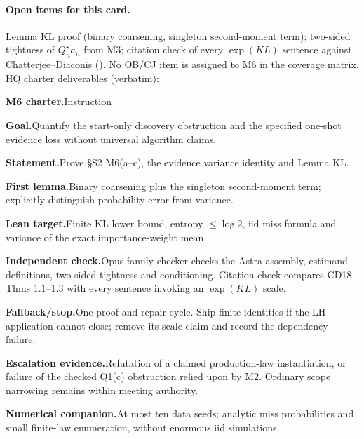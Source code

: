 \paragraph{Open items for this card.} Lemma KL proof (binary coarsening, singleton second-moment term); two-sided tightness of $Q^{\star}_n a_n$ from M3; citation check of every $\exp(KL)$ sentence against Chatterjee–Diaconis (). No OB/CJ item is assigned to M6 in the coverage matrix. HQ charter deliverables (verbatim):
\par\smallskip\noindent\textbf{M6 charter.}\enspace Instruction
\par\smallskip\noindent\textbf{Goal.}\enspace Quantify the start-only discovery obstruction and the specified one-shot evidence loss without universal algorithm claims.
\par\smallskip\noindent\textbf{Statement.}\enspace Prove §S2 M6(a–c), the evidence variance identity and Lemma KL.
\par\smallskip\noindent\textbf{First lemma.}\enspace Binary coarsening plus the singleton second-moment term; explicitly distinguish probability error from variance.
\par\smallskip\noindent\textbf{Lean target.}\enspace Finite KL lower bound, entropy \(\le\log2\), iid miss formula and variance of the exact importance-weight mean.
\par\smallskip\noindent\textbf{Independent check.}\enspace Opus-family checker checks the Astra assembly, estimand definitions, two-sided tightness and conditioning. Citation check compares CD18 Thms 1.1–1.3 with every sentence invoking an \(\exp(KL)\) scale.
\par\smallskip\noindent\textbf{Fallback/stop.}\enspace One proof-and-repair cycle. Ship finite identities if the LH application cannot close; remove its scale claim and record the dependency failure.
\par\smallskip\noindent\textbf{Escalation evidence.}\enspace Refutation of a claimed production-law instantiation, or failure of the checked Q1(c) obstruction relied upon by M2. Ordinary scope narrowing remains within meeting authority.
\par\smallskip\noindent\textbf{Numerical companion.}\enspace At most ten data seeds; analytic miss probabilities and small finite-law enumeration, without enormous iid simulations.

